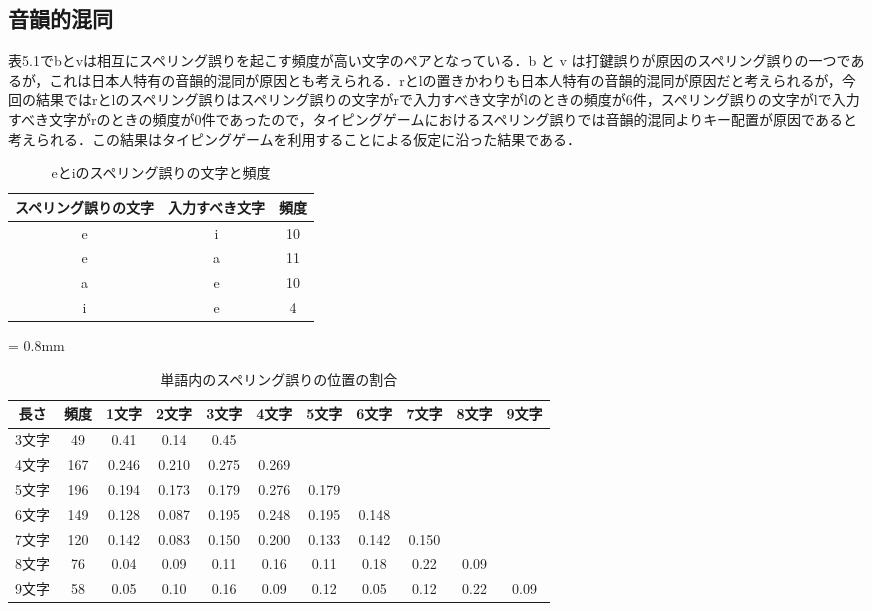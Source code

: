 \subsection{音韻的混同}
表5.1でbとvは相互にスペリング誤りを起こす頻度が高い文字のペアとなっている．b と v は打鍵誤りが原因のスペリング誤りの一つであるが，これは日本人特有の音韻的混同が原因とも考えられる．rとlの置きかわりも日本人特有の音韻的混同が原因だと考えられるが，今回の結果ではrとlのスペリング誤りはスペリング誤りの文字がrで入力すべき文字がlのときの頻度が6件，スペリング誤りの文字がlで入力すべき文字がrのときの頻度が0件であったので，タイピングゲームにおけるスペリング誤りでは音韻的混同よりキー配置が原因であると考えられる．この結果はタイピングゲームを利用することによる仮定に沿った結果である．

\begin{comment}
表5.1においてのスペリング誤りの文字がbで入力すべき文字がvのときの頻度が9件，スペリング誤りの文字がvで入力すべき文字がbのときの頻度が12件であった．
\end{comment}

 \begin{table}[t]
  \small
  \begin{center}
   \caption{eとiのスペリング誤りの文字と頻度}
   \begin{tabular}{|c|c|c|} \hline
       	スペリング誤りの文字 & 入力すべき文字 & 頻度\\ \hline
	    e & i & 10\\ \hline
	    e & a & 11\\ \hline
	    a & e & 10\\ \hline
	    i & e & 4\\ \hline
   \end{tabular}
  \end{center}
 \end{table}

{\tabcolsep = 0.8mm
 \begin{table}[t]
  \small
  \centering
   \caption{単語内のスペリング誤りの位置の割合}
   \begin{tabular}{|c|c|c|c|c|c|c|c|c|c|c|} \hline
       	長さ & 頻度 & 1文字 & 2文字 & 3文字 & 4文字 & 5文字 & 6文字 & 7文字 & 8文字 & 9文字\\ \hline
	    3文字 & 49 & 0.41 & 0.14 & 0.45 &  &  &  &  &  & \\ \hline
	    4文字 & 167 & 0.246 & 0.210 & 0.275 & 0.269 &  &  &  &  & \\ \hline
	    5文字 & 196 & 0.194 & 0.173 & 0.179 & 0.276 & 0.179 &  &  &  & \\ \hline
	    6文字 & 149 & 0.128 & 0.087 & 0.195 & 0.248 & 0.195 & 0.148 &  &  & \\ \hline
	    7文字 & 120 & 0.142 & 0.083 & 0.150 & 0.200 & 0.133 & 0.142 & 0.150 &  & \\ \hline
	    8文字 & 76 & 0.04 & 0.09 & 0.11 & 0.16 & 0.11 & 0.18 & 0.22 & 0.09 & \\ \hline
	    9文字 & 58 & 0.05 & 0.10 & 0.16 & 0.09 & 0.12 & 0.05 & 0.12 & 0.22 & 0.09 \\ \hline
   \end{tabular}
 \end{table}
}


